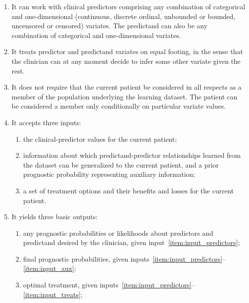 \documentclass[utf8]{FrontiersinHarvard_mod} %
\renewcommand*{\|}[1][]{\nonscript\:#1\vert\nonscript\:\mathopen{}}
\begin{document}
\begin{enumerate}
\item\label{item:feat_variates} It can work with clinical predictors comprising any combination of categorical and one-dimensional (continuous, discrete ordinal, unbounded or bounded, uncensored or censored) variates. The predictand can also be any combination of categorical and one-dimensional variates.

\item\label{item:feat_indifferentvariates} It treats predictor and predictand variates on equal footing, in the sense that the clinician can at any moment decide to infer some other variate given the rest.
\item\label{item:feat_conditionalstats} It does not require that the current patient be considered in all respects as a member of the population underlying the learning dataset. The patient can be considered a member only conditionally on particular variate values.
  
\item\label{item:feat_inputs} It accepts three inputs:
  \begin{enumerate}
  \item\label{item:input_predictors} the clinical-predictor values for the current patient;
  \item\label{item:input_aux} information about which predictand-predictor relationships learned from the dataset can be generalized to the current patient, and a prior prognostic probability representing auxiliary information;
  \item\label{item:input_treats} a set of treatment options and their benefits and losses for the current patient.
  \end{enumerate}

\item\label{item:feat_outputs} It yields three basic outputs:
  \begin{enumerate}
  \item\label{item:ouput_predictors} any prognostic probabilities or likelihoods about predictors and predictand desired by the clinician, given input~\ref{item:input_predictors};
  \item\label{item:output_aux} final prognostic probabilities, given inputs~\ref{item:input_predictors}--\ref{item:input_aux};
  \item\label{item:output_treats} optimal treatment, given inputs~\ref{item:input_predictors}--\ref{item:input_treats};
  \end{enumerate}
  

\end{enumerate}
\end{document}
